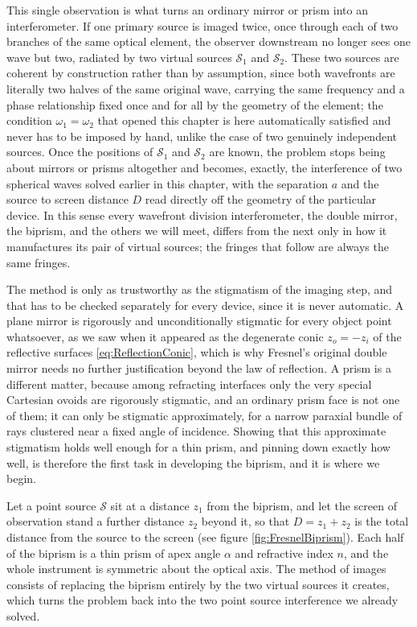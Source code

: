         This single observation is what turns an ordinary mirror or prism into an interferometer. If one primary source is imaged twice, once through each of two branches of the same optical element, the observer downstream no longer sees one wave but two, radiated by two virtual sources $\mathcal{S}_1$ and $\mathcal{S}_2$. These two sources are coherent by construction rather than by assumption, since both wavefronts are literally two halves of the same original wave, carrying the same frequency and a phase relationship fixed once and for all by the geometry of the element; the condition $\omega_1=\omega_2$ that opened this chapter is here automatically satisfied and never has to be imposed by hand, unlike the case of two genuinely independent sources. Once the positions of $\mathcal{S}_1$ and $\mathcal{S}_2$ are known, the problem stops being about mirrors or prisms altogether and becomes, exactly, the interference of two spherical waves solved earlier in this chapter, with the separation $a$ and the source to screen distance $D$ read directly off the geometry of the particular device. In this sense every wavefront division interferometer, the double mirror, the biprism, and the others we will meet, differs from the next only in how it manufactures its pair of virtual sources; the fringes that follow are always the same fringes.

        The method is only as trustworthy as the stigmatism of the imaging step, and that has to be checked separately for every device, since it is never automatic. A plane mirror is rigorously and unconditionally stigmatic for every object point whatsoever, as we saw when it appeared as the degenerate conic $z_o=-z_i$ of the reflective surfaces \ref{eq:ReflectionConic}, which is why Fresnel's original double mirror needs no further justification beyond the law of reflection. A prism is a different matter, because among refracting interfaces only the very special Cartesian ovoids are rigorously stigmatic, and an ordinary prism face is not one of them; it can only be stigmatic approximately, for a narrow paraxial bundle of rays clustered near a fixed angle of incidence. Showing that this approximate stigmatism holds well enough for a thin prism, and pinning down exactly how well, is therefore the first task in developing the biprism, and it is where we begin.

        Let a point source $\mathcal{S}$ sit at a distance $z_1$ from the biprism, and let the screen of observation stand a further distance $z_2$ beyond it, so that $D = z_1 + z_2$ is the total distance from the source to the screen (see figure \ref{fig:FresnelBiprism}). Each half of the biprism is a thin prism of apex angle $\alpha$ and refractive index $n$, and the whole instrument is symmetric about the optical axis. The method of images consists of replacing the biprism entirely by the two virtual sources it creates, which turns the problem back into the two point source interference we already solved.

